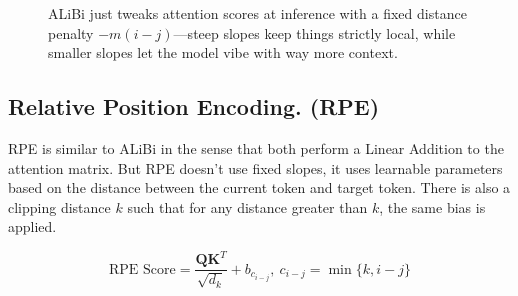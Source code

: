 \documentclass[10pt]{article}
\theoremstyle{plain}
\begin{document}
\begin{figure}[H]
{
}
\caption{%
ALiBi just tweaks attention scores at inference with a fixed distance penalty $-m(i-j)$---steep slopes keep things strictly local, while smaller slopes let the model vibe with way more context.
}
\label{fig:alibi_matrices}
\end{figure}

\subsection{Relative Position Encoding. (RPE)}

RPE is similar to ALiBi in the sense that both perform a Linear Addition to the attention matrix. But RPE doesn't use fixed slopes, it uses learnable parameters based on the distance between the current token and target token. There is also a clipping distance \(k\) such that for any distance greater than \(k\), the same bias is applied. 

\[
    \text{RPE Score} = \frac{\mathbf{Q} \mathbf{K} ^T}{\sqrt{d_k}} + b_{c_{i - j}},\ c_{i - j} = \min \{k, i - j \}
\]
\end{document}
